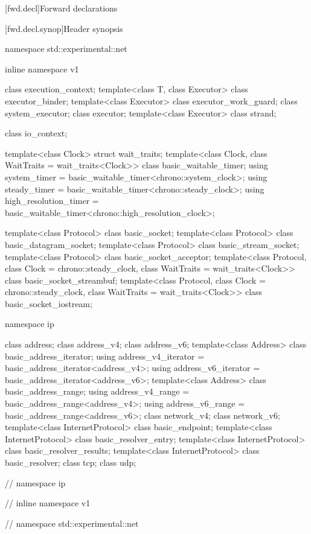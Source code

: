 
[fwd.decl]{Forward declarations}


%
[fwd.decl.synop]{Header  synopsis}

\begin{codeblock}
namespace std::experimental::net {
inline namespace v1 {

  class execution_context;
  template<class T, class Executor>
    class executor_binder;
  template<class Executor>
    class executor_work_guard;
  class system_executor;
  class executor;
  template<class Executor>
    class strand;

  class io_context;

  template<class Clock> struct wait_traits;
  template<class Clock, class WaitTraits = wait_traits<Clock>>
    class basic_waitable_timer;
  using system_timer = basic_waitable_timer<chrono::system_clock>;
  using steady_timer = basic_waitable_timer<chrono::steady_clock>;
  using high_resolution_timer = basic_waitable_timer<chrono::high_resolution_clock>;

  template<class Protocol>
    class basic_socket;
  template<class Protocol>
    class basic_datagram_socket;
  template<class Protocol>
    class basic_stream_socket;
  template<class Protocol>
    class basic_socket_acceptor;
  template<class Protocol, class Clock = chrono::steady_clock,
    class WaitTraits = wait_traits<Clock>>
      class basic_socket_streambuf;
  template<class Protocol, class Clock = chrono::steady_clock,
    class WaitTraits = wait_traits<Clock>>
      class basic_socket_iostream;

  namespace ip {

    class address;
    class address_v4;
    class address_v6;
    template<class Address>
      class basic_address_iterator;
    using address_v4_iterator = basic_address_iterator<address_v4>;
    using address_v6_iterator = basic_address_iterator<address_v6>;
    template<class Address>
      class basic_address_range;
    using address_v4_range = basic_address_range<address_v4>;
    using address_v6_range = basic_address_range<address_v6>;
    class network_v4;
    class network_v6;
    template<class InternetProtocol>
      class basic_endpoint;
    template<class InternetProtocol>
      class basic_resolver_entry;
    template<class InternetProtocol>
      class basic_resolver_results;
    template<class InternetProtocol>
      class basic_resolver;
    class tcp;
    class udp;

  } // namespace ip
} // inline namespace v1
} // namespace std::experimental::net
\end{codeblock}

